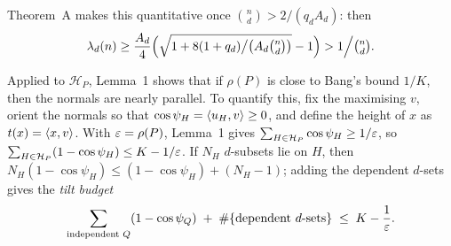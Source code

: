 \documentclass[11pt]{article}
\begin{document}
Theorem~A makes this quantitative once $\binom nd>2/(q_dA_d)$: then
\[
\lambda_d(n)\ge\frac{A_d}{4}\Bigl(\sqrt{1+8(1+q_d)\big/\bigl(A_d\tbinom nd\bigr)}-1\Bigr)>1\Big/\tbinom nd.
\]

Applied to $\mathcal H_P$, Lemma~1 shows that if $\rho(P)$ is close to Bang's bound $1/K$, then the
normals are nearly parallel. To quantify this, fix the maximising $v$, orient the normals so that
$\cos\psi_H=\langle u_H,v\rangle\ge0$, and define the height of $x$ as $t(x)=\langle x,v\rangle$. With $\varepsilon=\rho(P)$, Lemma~1 gives $\sum_{H\in\mathcal H_P}\cos\psi_H\ge1/\varepsilon$, so
$\sum_{H\in\mathcal H_P}(1-\cos\psi_H)\le K-1/\varepsilon$. If $N_H$ $d$-subsets lie on $H$, then
$N_H(1-\cos\psi_H)\le(1-\cos\psi_H)+(N_H-1)$; adding the dependent $d$-sets gives the \emph{tilt
budget}
\[
\sum_{\text{independent }Q}(1-\cos\psi_Q)\;+\;\#\{\text{dependent }d\text{-sets}\}\;\le\;K-\frac1{\varepsilon}.
\]
\end{document}
